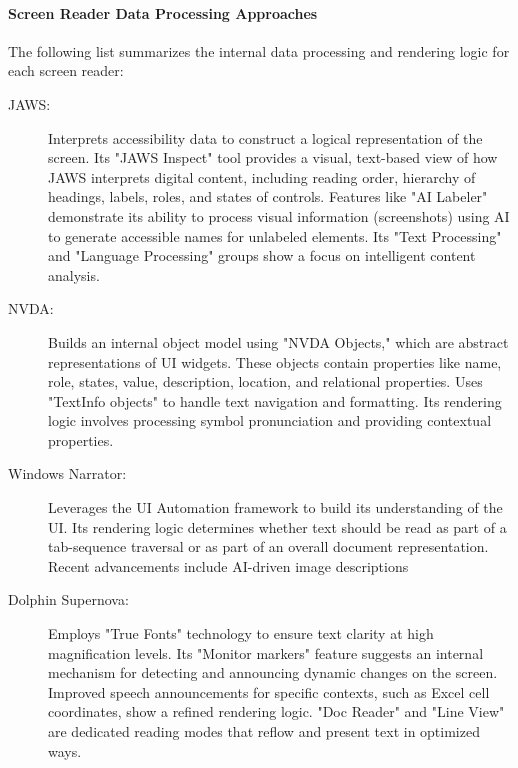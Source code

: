 \paragraph{Screen Reader Data Processing Approaches}
The following list summarizes the internal data processing and rendering logic for each screen reader:

\begin{description}
    \item[JAWS:] Interprets accessibility data to construct a logical representation of the screen. Its "JAWS Inspect" tool provides a visual, text-based view of how JAWS interprets digital content, including reading order, hierarchy of headings, labels, roles, and states of controls. \cite{JAWSInspect} Features like "AI Labeler" demonstrate its ability to process visual information (screenshots) using AI to generate accessible names for unlabeled elements. \cite{JAWSAILabeler} Its "Text Processing" and "Language Processing" groups show a focus on intelligent content analysis. \cite{JAWSWhatsNew}
    \item[NVDA:] Builds an internal object model using "NVDA Objects," which are abstract representations of UI widgets. \cite{AssistivLabsNVDAArch} These objects contain properties like name, role, states, value, description, location, and relational properties. Uses "TextInfo objects" to handle text navigation and formatting. Its rendering logic involves processing symbol pronunciation and providing contextual properties. \cite{NVDASpeech}
    \item[Windows Narrator:] Leverages the UI Automation framework to build its understanding of the UI. Its rendering logic determines whether text should be read as part of a tab-sequence traversal or as part of an overall document representation. \cite{NarratorTechDetails} Recent advancements include AI-driven image descriptions \cite{NarratorImageDescriptions}
    \item[Dolphin Supernova:] Employs "True Fonts" technology to ensure text clarity at high magnification levels. \cite{SuperNovaFeatures} Its "Monitor markers" feature suggests an internal mechanism for detecting and announcing dynamic changes on the screen. Improved speech announcements for specific contexts, such as Excel cell coordinates, show a refined rendering logic. "Doc Reader" and "Line View" are dedicated reading modes that reflow and present text in optimized ways. \cite{SuperNovaFeatures}
\end{description}

